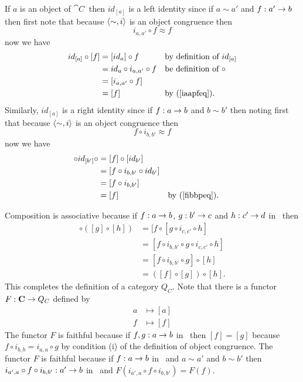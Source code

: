 \documentclass[10pt,a4paper]{article}
\theoremstyle{remark}
\newcommand{\catc}{\cat{C}}
\newcommand{\catcw}{\cat{C}\ }
\begin{document}
If $a$ is an object of $\catcw$ then $id_{[a]}$ is a left identity since if  $a \sim a'$ and $f:a' \rightarrow b$ then 
first note that because $\langle\sim,i\rangle$ is an object congruence then
\begin{equation}
\label{iaapfeq}
i_{a,a'} \circ f  \approx f
\end{equation}
now we have 
\begin{align*}
id_{[a]} \circ [f] 
         & = [id_a] \circ f               && \mbox{by definition of $id_{[a]}$}    \\
				 & = id_a \circ i_{a,a'} \circ f  && \mbox{be definition of $\circ$}       \\
         &= [i_{a,a'} \circ f]                                                     \\
         &= [f]                           && \mbox {by (\ref{iaapfeq}). }
\end{align*}
Similarly, $id_{[a]}$ is a right identity since if $f:a \rightarrow b$ and $b \sim b'$  then
noting first  that because $\langle\sim,i\rangle$ is an object congruence then
\begin{equation}
\label{fibbpeq}
 f \circ i_{b,b'} \approx f
\end{equation}
now we have 
\begin{align*}
[f] \circ id_{[b']} \circ  
                 & = [f]  \circ [id_{b'}]                                     \\
                 &=  [f \circ i_{b,b'} \circ id_{b'} ]                                  \\
                 &=  [f \circ i_{b,b'} ]                                                \\
                 &=  [f]                               &&\mbox {by (\ref{fibbpeq}). }
\end{align*}


Composition is associative because if $f:a \rightarrow b$, $g: b' \rightarrow c$  and $h: c' \rightarrow d$ in \catcw then
\begin{align*}
[f] \circ ([g] \circ [h]) &= [f \circ [g \circ i_{c,c'} \circ h]               \\
                          &= [f \circ i_{b,b'} \circ g \circ i_{c,c'} \circ h] \\
													&= [f \circ i_{b,b'} \circ g] \circ [h]              \\
													&= ([f] \circ [g]) \circ [h].
\end{align*}
This completes the definition of a category $Q_C$.
Note that there is a functor $F: \catc \morph Q_C$ defined by
\begin{align*}
       a & \mapsto [a] \\
			 f & \mapsto [f]
\end{align*}
The functor $F$ is faithful because if $f,g : a \rightarrow b$ in \catcw then $[f]=[g]$ because $f \circ i_{b,b}=i_{a,a} \circ g$ by condition (i) of the definition of object congruence.
The functor $F$ is faithful because if $f:a \rightarrow b$ in \catcw and $a \sim a'$ and
$b \sim b'$ then $i_{a',a} \circ f \circ i_{b,b'}: a' \rightarrow b$ in \catcw and 
$F(i_{a',a} \circ f \circ i_{b,b'})=F(f)$.  



 

\end{document}

